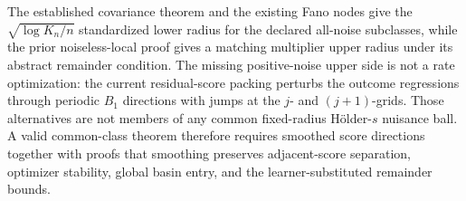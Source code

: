 The established covariance theorem and the existing Fano nodes give the \(\sqrt{\log K_n/n}\) standardized lower radius for the declared all-noise subclasses, while the prior noiseless-local proof gives a matching multiplier upper radius under its abstract remainder condition.  The missing positive-noise upper side is not a rate optimization: the current residual-score packing perturbs the outcome regressions through periodic \(B_1\) directions with jumps at the \(j\)- and \((j+1)\)-grids.  Those alternatives are not members of any common fixed-radius Hölder-\(s\) nuisance ball.  A valid common-class theorem therefore requires smoothed score directions together with proofs that smoothing preserves adjacent-score separation, optimizer stability, global basin entry, and the learner-substituted remainder bounds.